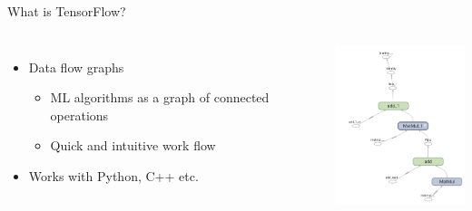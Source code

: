 \begin{frame}{What is TensorFlow?}
    \begin{columns}[T]
            \vspace{1cm}
                \begin{itemize}
                    \item Data flow graphs
                    \begin{itemize}
                        \item ML algorithms as a graph of connected operations
                        \item Quick and intuitive work flow
                    \end{itemize}
                \item Works with Python, C++ etc.
                \end{itemize}
            \vspace{.5cm}
            \hspace*{-4cm}
            \includegraphics[width=4cm]{assets/TensorFlow_Graph_Example.png} 
                \\
                \vspace{-.1cm}
                \hspace*{-4cm}\caption{Source: tensorflow.org}
    \end{columns}
\end{frame}

